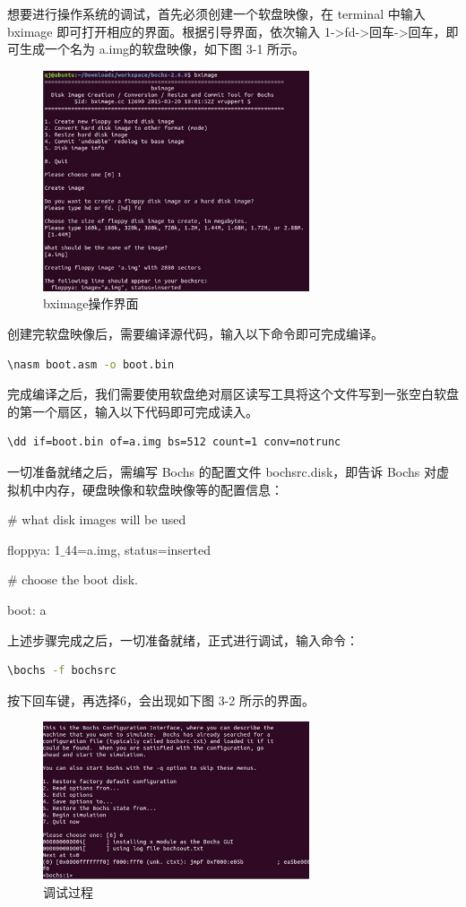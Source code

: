 想要进行操作系统的调试，首先必须创建一个软盘映像，在 terminal 中输入 bximage 即可打开相应的界面。根据引导界面，依次输入 1->fd->回车->回车，即可生成一个名为 a.img的软盘映像，如下图 3-1 所示。
\begin{figure}[H]
  \centering
  \includegraphics[width=0.7\textwidth]{figures/chapter3/3-1.jpg}
  \caption{bximage操作界面}
  \label{fig:1}
\end{figure}

创建完软盘映像后，需要编译源代码，输入以下命令即可完成编译。
\begin{lstlisting}[language = bash]
  \nasm boot.asm -o boot.bin
\end{lstlisting}

完成编译之后，我们需要使用软盘绝对扇区读写工具将这个文件写到一张空白软盘的第一个扇区，输入以下代码即可完成读入。
\begin{lstlisting}[language = bash]
  \dd if=boot.bin of=a.img bs=512 count=1 conv=notrunc
\end{lstlisting}
一切准备就绪之后，需编写 Bochs 的配置文件 bochsrc.disk，即告诉 Bochs 对虚拟机中内存，硬盘映像和软盘映像等的配置信息：\par
\# what disk images will be used\par
floppya: 1$\_$44=a.img, status=inserted\par
\# choose the boot disk.\par
boot: a\par

上述步骤完成之后，一切准备就绪，正式进行调试，输入命令：
\begin{lstlisting}[language = bash]
  \bochs -f bochsrc
\end{lstlisting}
按下回车键，再选择6，会出现如下图 3-2 所示的界面。
\begin{figure}[H]
  \centering
  \includegraphics[width=0.7\textwidth]{figures/chapter3/3-2.jpg}
  \caption{调试过程}
  \label{fig:2}
\end{figure}

